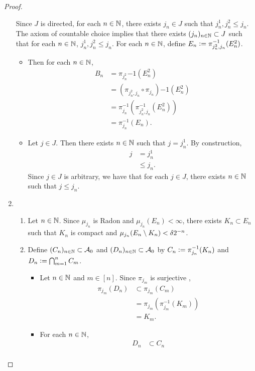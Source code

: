 \documentclass{book}
\begin{document}
\begin{proof}
\begin{enumerate}
		Since $J$ is directed, for each $n \in \mathbb{N}$, there exists $j_n \in J$ such that $j^1_n, j^2_n \leq j_n$. The axiom of countable choice implies that there exists $(j_n)_{n \in \mathbb{N}} \subset J$ such that for each $n \in \mathbb{N}$, $j^1_n, j^2_n \leq j_n$. For each $n \in \mathbb{N}$, define $E_n \vcentcolon= \pi_{j^2_n, j_n}^{-1}(E^2_n)$. 
		\begin{itemize}
			\item Then for each $n \in \mathbb{N}$, 
			\begin{align*}
				B_n
				& = \pi_{j^2_n}{-1}(E^2_n) \\
				& = (\pi_{j^2_n, j_n} \circ \pi_{j_n}){-1}(E^2_n) \\
				& = \pi_{j_n}^{-1}(\pi_{j^2_n, j_n}^{-1}(E^2_n)) \\
				& = \pi_{j_n}^{-1}(E_n).
			\end{align*}
			\item Let $j \in J$. Then there exists $n \in \mathbb{N}$ such that $j = j^1_n$. By construction, 
			\begin{align*}
				j
				& = j^1_n \\
				& \leq j_n.
			\end{align*}
			Since $j \in J$ is arbitrary, we have that for each $j \in J$, there exists $n \in \mathbb{N}$ such that $j \leq j_n$. 
		\end{itemize}
		\item
		\begin{enumerate}
			\item Let $n \in \mathbb{N}$. Since $\mu_{j_n}$ is Radon and $\mu_{j_n}(E_n) < \infty$, there exists $K_n \subset E_n$ such that $K_n$ is compact and $\mu_{j_n}(E_n \setminus K_n) < \delta2^{-n}$.
			\item Define $(C_n)_{n \in \mathbb{N}} \subset \mathcal{A}_0$ and $(D_n)_{n \in \mathbb{N}} \subset \mathcal{A}_0$ by $C_n \vcentcolon= \pi_{j_n}^{-1}(K_n)$ and $D_n \vcentcolon= \bigcap_{m=1}^n C_m$. 
			\begin{itemize}
				\item Let $n \in \mathbb{N}$ and $m \in [n]$. Since $\pi_{j_m}$ is surjective , 
				\begin{align*}
					\pi_{j_m}(D_n)
					& \subset \pi_{j_m}(C_m) \\
					& = \pi_{j_m}(\pi_{j_m}^{-1}(K_m)) \\
					& = K_m. 
				\end{align*}
				\item For each $n \in \mathbb{N}$, 
				\begin{align*}
					D_n 
					& \subset C_n \\

\end{align*}
\end{itemize}
\end{enumerate}
\end{enumerate}
\end{proof}
\end{document}
